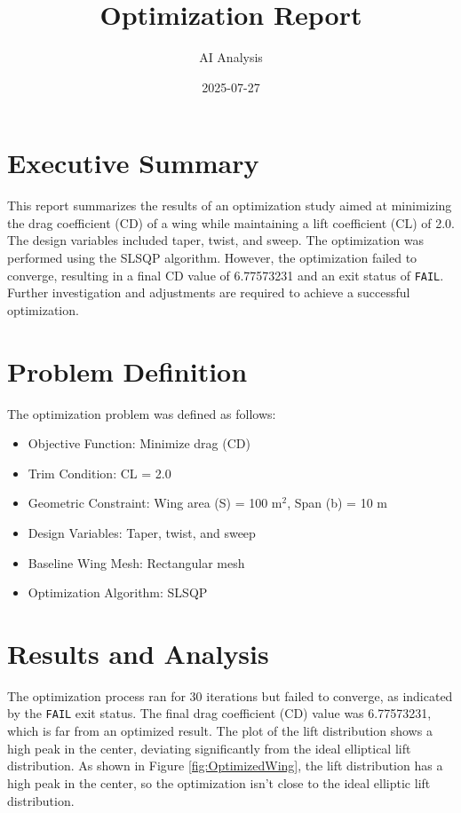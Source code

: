 \documentclass{article}
\title{Optimization Report}
\author{AI Analysis}
\date{2025-07-27}
\begin{document}
\maketitle

\section{Executive Summary}
This report summarizes the results of an optimization study aimed at minimizing the drag coefficient (CD) of a wing while maintaining a lift coefficient (CL) of 2.0. The design variables included taper, twist, and sweep. The optimization was performed using the SLSQP algorithm. However, the optimization failed to converge, resulting in a final CD value of 6.77573231 and an exit status of \texttt{FAIL}. Further investigation and adjustments are required to achieve a successful optimization.

\section{Problem Definition}
The optimization problem was defined as follows:
\begin{itemize}
    \item Objective Function: Minimize drag (CD)
    \item Trim Condition: CL = 2.0
    \item Geometric Constraint: Wing area (S) = 100 m$^2$, Span (b) = 10 m
    \item Design Variables: Taper, twist, and sweep
    \item Baseline Wing Mesh: Rectangular mesh
    \item Optimization Algorithm: SLSQP
\end{itemize}

\section{Results and Analysis}
The optimization process ran for 30 iterations but failed to converge, as indicated by the \texttt{FAIL} exit status. The final drag coefficient (CD) value was 6.77573231, which is far from an optimized result. The plot of the lift distribution shows a high peak in the center, deviating significantly from the ideal elliptical lift distribution.  As shown in Figure \ref{fig:OptimizedWing}, the lift distribution has a high peak in the center, so the optimization isn't close to the ideal elliptic lift distribution.
\end{document}
